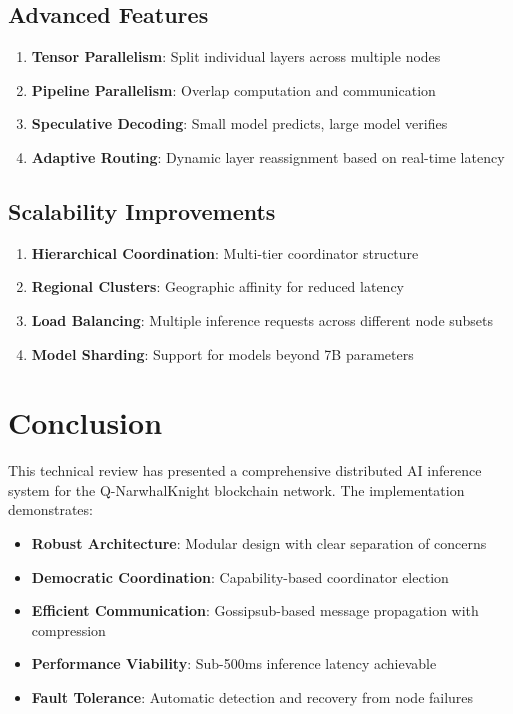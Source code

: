 \documentclass[12pt,a4paper]{article}
\begin{document}
\subsection{Advanced Features}

\begin{enumerate}
    \item \textbf{Tensor Parallelism}: Split individual layers across multiple nodes
    \item \textbf{Pipeline Parallelism}: Overlap computation and communication
    \item \textbf{Speculative Decoding}: Small model predicts, large model verifies
    \item \textbf{Adaptive Routing}: Dynamic layer reassignment based on real-time latency
\end{enumerate}

\subsection{Scalability Improvements}

\begin{enumerate}
    \item \textbf{Hierarchical Coordination}: Multi-tier coordinator structure
    \item \textbf{Regional Clusters}: Geographic affinity for reduced latency
    \item \textbf{Load Balancing}: Multiple inference requests across different node subsets
    \item \textbf{Model Sharding}: Support for models beyond 7B parameters
\end{enumerate}

\section{Conclusion}

This technical review has presented a comprehensive distributed AI inference system for the Q-NarwhalKnight blockchain network. The implementation demonstrates:

\begin{itemize}
    \item \textbf{Robust Architecture}: Modular design with clear separation of concerns
    \item \textbf{Democratic Coordination}: Capability-based coordinator election
    \item \textbf{Efficient Communication}: Gossipsub-based message propagation with compression
    \item \textbf{Performance Viability}: Sub-500ms inference latency achievable
    \item \textbf{Fault Tolerance}: Automatic detection and recovery from node failures
\end{itemize}
\end{document}

